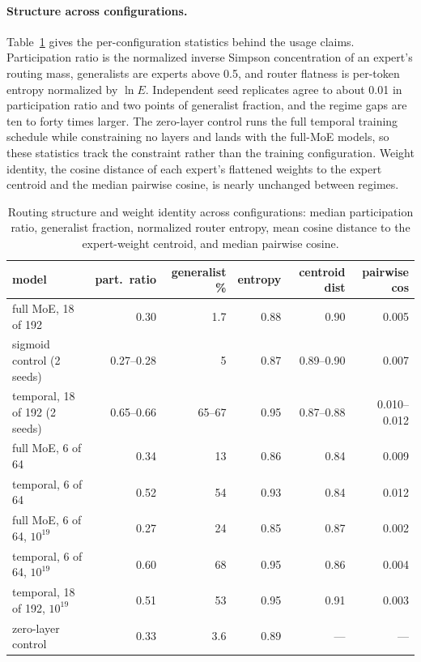 \documentclass{article}
\begin{document}
\paragraph{Structure across configurations.} Table~\ref{tab:structural} gives the per-configuration
statistics behind the usage claims. Participation ratio is the normalized inverse Simpson
concentration of an expert's routing mass, generalists are experts above 0.5, and router
flatness is per-token entropy normalized by $\ln E$. Independent seed replicates agree to
about 0.01 in participation ratio and two points of generalist fraction, and the regime
gaps are ten to forty times larger. The zero-layer control runs the full temporal training
schedule while constraining no layers and lands with the full-MoE models, so these
statistics track the constraint rather than the training configuration. Weight identity,
the cosine distance of each expert's flattened weights to the expert centroid and the
median pairwise cosine, is nearly unchanged between regimes.

\begin{table}[h]
  \centering\small
  \caption{Routing structure and weight identity across configurations: median participation
  ratio, generalist fraction, normalized router entropy, mean cosine distance to the
  expert-weight centroid, and median pairwise cosine.}
  \label{tab:structural}
  \vspace{4pt}
  \begin{tabular}{@{}lrrrrr@{}}
    \toprule
    model & part.\ ratio & generalist \% & entropy & centroid dist & pairwise cos \\
    \midrule
    full MoE, 18 of 192            & 0.30 & 1.7 & 0.88 & 0.90 & 0.005 \\
    sigmoid control (2 seeds)      & 0.27--0.28 & 5 & 0.87 & 0.89--0.90 & 0.007 \\
    temporal, 18 of 192 (2 seeds)  & 0.65--0.66 & 65--67 & 0.95 & 0.87--0.88 & 0.010--0.012 \\
    full MoE, 6 of 64              & 0.34 & 13 & 0.86 & 0.84 & 0.009 \\
    temporal, 6 of 64              & 0.52 & 54 & 0.93 & 0.84 & 0.012 \\
    full MoE, 6 of 64, $10^{19}$   & 0.27 & 24 & 0.85 & 0.87 & 0.002 \\
    temporal, 6 of 64, $10^{19}$   & 0.60 & 68 & 0.95 & 0.86 & 0.004 \\
    temporal, 18 of 192, $10^{19}$ & 0.51 & 53 & 0.95 & 0.91 & 0.003 \\
    zero-layer control             & 0.33 & 3.6 & 0.89 & --- & --- \\
    \bottomrule
  \end{tabular}
\end{table}
\end{document}
